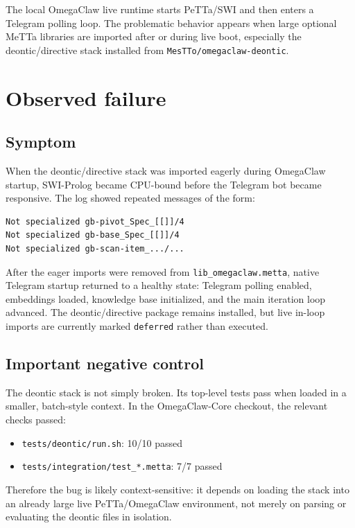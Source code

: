 \documentclass[11pt]{article}
\begin{document}
The local OmegaClaw live runtime starts PeTTa/SWI and then enters a Telegram polling loop. The problematic behavior appears when large optional MeTTa libraries are imported after or during live boot, especially the deontic/directive stack installed from \texttt{MesTTo/omegaclaw-deontic}.

\section{Observed failure}

\subsection{Symptom}

When the deontic/directive stack was imported eagerly during OmegaClaw startup, SWI-Prolog became CPU-bound before the Telegram bot became responsive. The log showed repeated messages of the form:

\begin{lstlisting}
Not specialized gb-pivot_Spec_[[]]/4
Not specialized gb-base_Spec_[[]]/4
Not specialized gb-scan-item_.../...
\end{lstlisting}

After the eager imports were removed from \texttt{lib_omegaclaw.metta}, native Telegram startup returned to a healthy state: Telegram polling enabled, embeddings loaded, knowledge base initialized, and the main iteration loop advanced. The deontic/directive package remains installed, but live in-loop imports are currently marked \texttt{deferred} rather than executed.

\subsection{Important negative control}

The deontic stack is not simply broken. Its top-level tests pass when loaded in a smaller, batch-style context. In the OmegaClaw-Core checkout, the relevant checks passed:

\begin{itemize}[nosep]
\item \texttt{tests/deontic/run.sh}: 10/10 passed
\item \texttt{tests/integration/test_*.metta}: 7/7 passed
\end{itemize}

Therefore the bug is likely context-sensitive: it depends on loading the stack into an already large live PeTTa/OmegaClaw environment, not merely on parsing or evaluating the deontic files in isolation.
\end{document}

